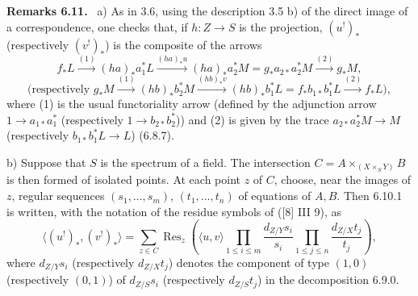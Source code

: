 \documentclass[11pt]{article}
\newenvironment{statement}[1]{\par\medskip\noindent\textbf{#1.}\ }{\par\medskip}
\begin{document}
\begin{statement}{Remarks 6.11}
a) As in 3.6, using the description 3.5 b) of the direct image of a correspondence, one checks that, if $h:Z\to S$ is the projection, $(u^!)_*$ (respectively $(v^!)_*$) is the composite of the arrows
\[
f_*L\xrightarrow{(1)}(ha)_*a_1^*L\xrightarrow{(ha)_*u}(ha)_*a_2^*M=g_*a_{2*}a_2^*M\xrightarrow{(2)}g_*M,
\]
\[
\text{(respectively }g_*M\xrightarrow{(1)}(hb)_*b_2^*M\xrightarrow{(hb)_*v}(hb)_*b_1^*L=f_*b_{1*}b_1^*L\xrightarrow{(2)}f_*L\text{)},
\]
where (1) is the usual functoriality arrow (defined by the adjunction arrow $1\to a_{1*}a_1^*$ (respectively $1\to b_{2*}b_2^*$)) and (2) is given by the trace $a_{2*}a_2^*M\to M$ (respectively $b_{1*}b_1^*L\to L$) (6.8.7).

b) Suppose that $S$ is the spectrum of a field. The intersection $C=A\times_{(X\times_S Y)}B$ is then formed of isolated points. At each point $z$ of $C$, choose, near the images of $z$, regular sequences $(s_1,\ldots,s_m)$, $(t_1,\ldots,t_n)$ of equations of $A,B$. Then 6.10.1 is written, with the notation of the residue symbols of ([8] III 9), as
\begin{equation}
\tag{6.11.1}
\langle (u^!)_*,(v^!)_*\rangle=
\sum_{z\in C}\operatorname{Res}_z\left(\langle u,v\rangle
\prod_{1\le i\le m}\frac{d_{Z/Y}s_i}{s_i}
\prod_{1\le j\le n}\frac{d_{Z/X}t_j}{t_j}\right),
\end{equation}
where $d_{Z/Y}s_i$ (respectively $d_{Z/X}t_j$) denotes the component of type $(1,0)$ (respectively $(0,1)$) of $d_{Z/S}s_i$ (respectively $d_{Z/S}t_j$) in the decomposition 6.9.0.
\end{statement}
\end{document}

